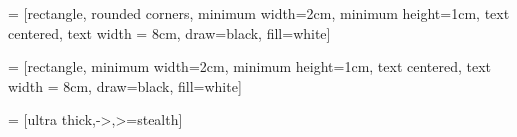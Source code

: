 % 

\usepackage[noabbrev, capitalise]{cleveref} %
\usepackage{xcolor} %
\usepackage{adjustbox} %
\usepackage{mathtools} %
\usepackage{blindtext}
\usepackage{pgf, pgffor}

\usepackage{geometry, lipsum}

\geometry {
    top = 1.2 in,
    bottom = 1.4 in,
    left = 1.2 in,
    right = 1.2 in
}

\setlength{\headheight}{20pt}%

\makeatletter
\newcommand{\gettikzxy}[3]{%
  \tikz@scan@one@point\pgfutil@firstofone#1\relax
  \edef#2{\the\pgf@x}%
  \edef#3{\the\pgf@y}%
}
\makeatother

\usepackage{tikz} %
\usetikzlibrary{positioning} %
\usetikzlibrary{calc} %
\usetikzlibrary{shapes.geometric, arrows}

 = [rectangle, rounded corners, minimum width=2cm, minimum height=1cm, text centered, text width = 8cm, draw=black, fill=white]


 = [rectangle, minimum width=2cm, minimum height=1cm, text centered, text width = 8cm, draw=black, fill=white]


 = [ultra thick,->,>=stealth]
